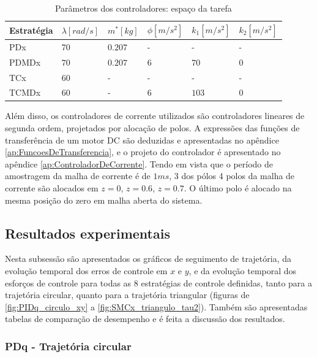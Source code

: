 \documentclass[]{politex}
\begin{document}
\begin{table}[H] 
\centering
\caption{Parâmetros dos controladores: espaço da tarefa}
\label{tab:parametrosControleEfetuador}
\begin{tabular}{l|l|l|l|l|l}
Estratégia & $\lambda [rad/s]$  & $m^*[kg]$ & $\phi[m/s^2]$ & $k_1[m/s^2]$ & $k_2[m/s^2]$ \\ \hline
PDx        & $70$               & $0.207$   & -             & -            & -            \\
PDMDx      & $70$               & $0.207$   & $6$           & $70$         & $0$          \\
TCx        & $60$               & -         & -             & -            & -            \\
TCMDx      & $60$               & -         & $6$           & $103$        & $0$          \\
\end{tabular}
\end{table}
Além disso, os controladores de corrente utilizados são controladores lineares de segunda ordem, projetados por alocação de polos. A expressões das funções de transferência de um motor DC são deduzidas e apresentadas no apêndice \ref{ap:FuncoesDeTransferencia}, e o projeto do controlador é apresentado no apêndice \ref{ap:ControladorDeCorrente}. Tendo em vista que o período de amostragem da malha de corrente é de $1ms$, 3 dos pólos 4 polos da malha de corrente são alocados em $z=0$, $z=0.6$, $z=0.7$. O último polo é alocado na mesma posição do zero em malha aberta do sistema.

\subsection{Resultados experimentais}

Nesta subsessão são apresentados os gráficos de seguimento de trajetória, da evolução temporal dos erros de controle em $x$ e $y$, e da evolução temporal dos esforços de controle para todas as 8 estratégias de controle definidas, tanto para a trajetória circular, quanto para a trajetória triangular (figuras de \ref{fig:PIDq_circulo_xy} a \ref{fig:SMCx_triangulo_tau2}). Também são apresentadas tabelas de comparação de desempenho e é feita a discussão dos resultados.

\newpage

\subsubsection{PDq - Trajetória circular}
\end{document}
